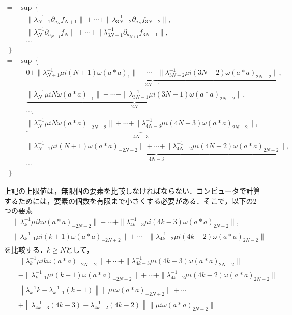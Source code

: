 \begin{enumerate}
\begin{equation}
  \begin{split}
    =& \sup \left\{ \right. \\
    &\quad \|\lambda^{-1}_{N+1}\partial_{a_{N}} f_{N+1}\| + \cdots + \|\lambda^{-1}_{3N-2}\partial_{a_{N}} f_{3N-2}\|, \\
    &\quad \|\lambda^{-1}_{N} \partial_{a_{N+1}} f_{N}\| + \cdots + \|\lambda^{-1}_{3N-1}\partial_{a_{N+1}} f_{3N-1}\|,\\
    &\quad \cdots\\
    \left.\right\}\\
    =& \sup \left\{ \right. \\
    &\quad \underbrace{0+ \|\lambda^{-1}_{N+1} \mu i (N+1) \omega (a*a)_{1}\| + \cdots + \|\lambda^{-1}_{3N-2} \mu i (3N-2) \omega (a*a)_{2N-2}\|}_{2N-1}, \\
    &\quad \underbrace{\|\lambda^{-1}_{N}  \mu i N \omega (a*a)_{-1}\| + \cdots + \|\lambda^{-1}_{3N-1} \mu i (3N-1) \omega (a*a)_{2N-2}\|}_{2N},\\
    &\quad \cdots, \\
    &\quad \underbrace{\|\lambda^{-1}_{N}  \mu i N \omega (a*a)_{-2N+2}\| + \cdots + \|\lambda^{-1}_{4N-3} \mu i (4N-3) \omega (a*a)_{2N-2}\|}_{4N-3},\\
    &\quad \underbrace{\|\lambda^{-1}_{N+1}  \mu i (N+1) \omega (a*a)_{-2N+2}\| + \cdots + \|\lambda^{-1}_{4N-2} \mu i (4N-2) \omega (a*a)_{2N-2}\|}_{4N-3},\\
    &\quad \cdots \\
    \left.\right\}
  \end{split}
\end{equation}

上記の上限値は，無限個の要素を比較しなければならない．コンピュータで計算するためには，要素の個数を有限まで小さくする必要がある．そこで，以下の2つの要素
\begin{align}
  &\|\lambda^{-1}_{k}  \mu i k \omega (a*a)_{-2N+2}\| + \cdots + \|\lambda^{-1}_{4k-3} \mu i (4k-3) \omega (a*a)_{2N-2}\|,\\
  &\|\lambda^{-1}_{k+1}  \mu i (k+1) \omega (a*a)_{-2N+2}\| + \cdots + \|\lambda^{-1}_{4k-2} \mu i (4k-2) \omega (a*a)_{2N-2}\|
\end{align}
を比較する．$k\geq N$として，
\begin{equation}
  \begin{split}
    &\|\lambda^{-1}_{k}  \mu i k \omega (a*a)_{-2N+2}\| + \cdots + \|\lambda^{-1}_{4k-3} \mu i (4k-3) \omega (a*a)_{2N-2}\|\\
    &-\|\lambda^{-1}_{k+1}  \mu i (k+1) \omega (a*a)_{-2N+2}\| + \cdots + \|\lambda^{-1}_{4k-2} \mu i (4k-2) \omega (a*a)_{2N-2}\|\\
    =& \left\| \lambda^{-1}_{k}k - \lambda^{-1}_{k+1}(k+1) \right\| \| \mu i \omega (a*a)_{-2N+2}\|+ \cdots \\
    &+ \left\| \lambda^{-1}_{4k-3}(4k-3) - \lambda^{-1}_{4k-2}(4k-2) \right\| \| \mu i \omega (a*a)_{2N-2}\|
  \end{split}
\end{equation}


\end{enumerate}

